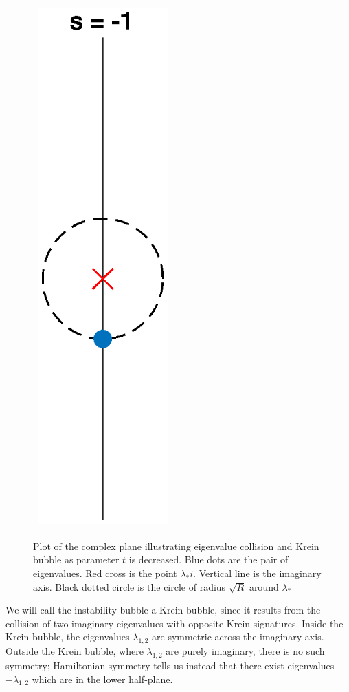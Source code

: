 \documentclass[thesis.tex]{subfiles}
\begin{document}
\begin{figure}
\begin{center}
\begin{tabular}{ccc}
\includegraphics[width=5cm]{images/kreinbubbles/bubbleminusR}
\end{tabular}
\caption{Plot of the complex plane illustrating eigenvalue collision and Krein bubble as parameter $t$ is decreased. Blue dots are the pair of eigenvalues. Red cross is the point $\lambda_* i$. Vertical line is the imaginary axis. Black dotted circle is the circle of radius $\sqrt{R}$ around $\lambda_*$ }
\label{fig:kreinbubbles}
\end{center}
\end{figure}

We will call the instability bubble a Krein bubble, since it results from the collision of two imaginary eigenvalues with opposite Krein signatures. Inside the Krein bubble, the eigenvalues $\lambda_{1,2}$ are symmetric across the imaginary axis. Outside the Krein bubble, where $\lambda_{1,2}$ are purely imaginary, there is no such symmetry; Hamiltonian symmetry tells us instead that there exist eigenvalues $-\lambda_{1,2}$ which are in the lower half-plane.
\end{document}
